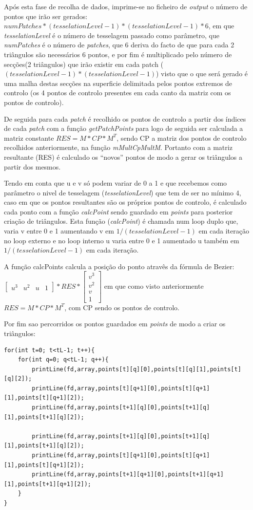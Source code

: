 \documentclass{article}
\begin{document}
Após esta fase de recolha de dados, imprime-se no ficheiro de \textit{output} o número de pontos que irão ser gerados: $numPatches*(tesselationLevel-1)*(tesselationLevel-1)*6$, em que \textit{tesselationLevel} é o número de tesselagem passado como parâmetro, que \textit{numPatches} é o número de \textit{patches}, que 6 deriva do facto de que para cada 2 triângulos são necessários 6 pontos, e por fim é multiplicado pelo número de secções(2 triângulos) que irão existir em cada patch ($(tesselationLevel-1)*(tesselationLevel-1)$) visto que o que será gerado é uma malha destas secções na superficie delimitada pelos pontos extremos de controlo (os 4 pontos de controlo presentes em cada canto da matriz com os pontos de controlo).

De seguida para cada \textit{patch} é recolhido os pontos de controlo a partir dos índices de cada \textit{patch} com a função \textit{getPatchPoints} para logo de seguida ser calculada a matriz constante $RES=M*CP*M^T$, sendo CP a matriz dos pontos de controlo recolhidos anteriormente, na função \textit{mMultCpMultM}. Portanto com a matriz resultante (RES) é calculado os ``novos'' pontos de modo a gerar os triângulos a partir dos mesmos. 

Tendo em conta que u e v só podem variar de 0 a 1 e que recebemos como parâmetro o nivel de tesselagem (\textit{tesselationLevel}) que tem de ser no mínimo 4, caso em que os pontos resultantes são os próprios pontos de controlo, é calculado cada ponto com a função \textit{calcPoint} sendo guardado em \textit{points} para posterior criação de triângulos. Esta função (\textit{calcPoint}) é chamada num loop duplo que, varia v entre 0 e 1 aumentando v em $1/(tesselationLevel-1)$ em cada iteração no loop externo e no loop interno u varia entre 0 e 1 aumentado u também em $1/(tesselationLevel-1)$ em cada iteração. 

A função calcPoints calcula a posição do ponto atravês da fórmula de Bezier: $\begin{bmatrix} u^3 & u^2 & u & 1 \end{bmatrix}*RES*\begin{bmatrix} v^3 \\ v^2 \\ v \\ 1 \end{bmatrix}$
em que como visto anteriormente $RES=M*CP*M^T$, com CP sendo os pontos de controlo.

Por fim sao percorridos os pontos guardados em \textit{points} de modo a criar os triângulos:
\begin{verbatim}
for(int t=0; t<tL-1; t++){
    for(int q=0; q<tL-1; q++){
        printLine(fd,array,points[t][q][0],points[t][q][1],points[t][q][2]);
        printLine(fd,array,points[t][q+1][0],points[t][q+1][1],points[t][q+1][2]);
        printLine(fd,array,points[t+1][q][0],points[t+1][q][1],points[t+1][q][2]);

        printLine(fd,array,points[t+1][q][0],points[t+1][q][1],points[t+1][q][2]);
        printLine(fd,array,points[t][q+1][0],points[t][q+1][1],points[t][q+1][2]);
        printLine(fd,array,points[t+1][q+1][0],points[t+1][q+1][1],points[t+1][q+1][2]);
    }
}
\end{verbatim}
\end{document}
